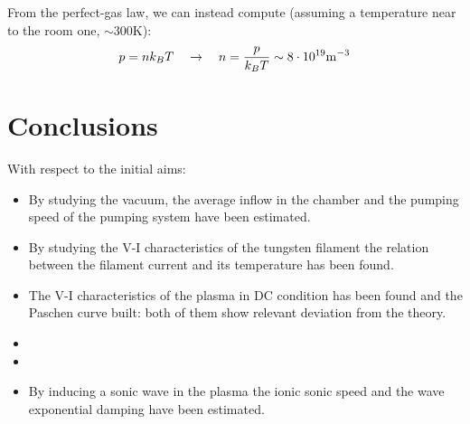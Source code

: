 \documentclass[11pt,a4 paper]{article}
\let\oldfrac\frac
\renewcommand{\frac}[3][d]{\ifthenelse{\equal{#1}{d}}{\oldfrac{#2}{#3}}{\nicefrac{#2}{#3}}}
\begin{document}
From the perfect-gas law, we can instead compute (assuming a temperature near to the room one, $\sim300\si{\kelvin}$):
\begin{equation*}
  p = nk_BT\quad\rightarrow\quad n = \frac{p}{k_BT} \sim 8\cdot10^{19} \si{\metre^{-3}}
\end{equation*}


\section{Conclusions}
With respect to the initial aims:
\begin{itemize}
  \item By studying the vacuum, the average inflow in the chamber and the pumping speed of the pumping system have been estimated.
  \item By studying the V-I characteristics of the tungsten filament the relation between the filament current and its temperature has been found.
  \item The V-I characteristics of the plasma in DC condition has been found and the Paschen curve built: both of them show relevant deviation from the theory.
  \item {}
  \item {}
  \item By inducing a sonic wave in the plasma the ionic sonic speed and the wave exponential damping have been estimated.
\end{itemize}


\end{document}
